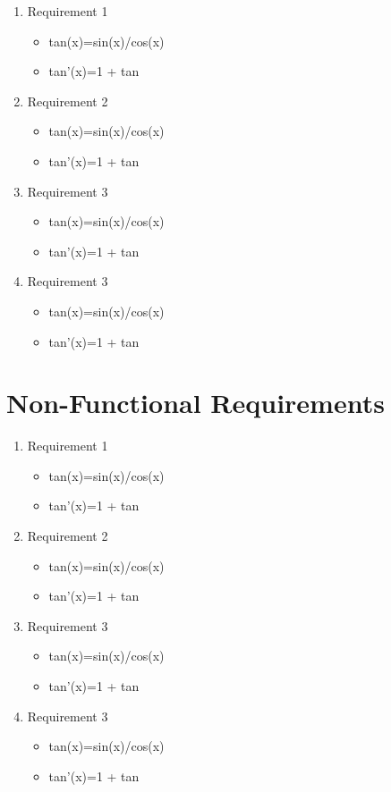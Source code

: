 \documentclass[10pt,a4paper,twoside]{article}
\begin{document}
\begin{enumerate}
\item 
Requirement 1
\begin{itemize}
\item tan(x)=sin(x)/cos(x)
\item tan'(x)=1 + tan
\end{itemize} 
\item
Requirement 2
\begin{itemize}
\item tan(x)=sin(x)/cos(x)
\item tan'(x)=1 + tan
\end{itemize} 
\item
Requirement 3
\begin{itemize}
\item tan(x)=sin(x)/cos(x)
\item tan'(x)=1 + tan
\end{itemize} 
\item
Requirement 3
\begin{itemize}
\item tan(x)=sin(x)/cos(x)
\item tan'(x)=1 + tan
\end{itemize} 

\end{enumerate}
\section{Non-Functional Requirements}

\begin{enumerate}
\item 
Requirement 1
\begin{itemize}
\item tan(x)=sin(x)/cos(x)
\item tan'(x)=1 + tan
\end{itemize} 
\item
Requirement 2
\begin{itemize}
\item tan(x)=sin(x)/cos(x)
\item tan'(x)=1 + tan
\end{itemize} 
\item
Requirement 3
\begin{itemize}
\item tan(x)=sin(x)/cos(x)
\item tan'(x)=1 + tan
\end{itemize} 
\item
Requirement 3
\begin{itemize}
\item tan(x)=sin(x)/cos(x)
\item tan'(x)=1 + tan
\end{itemize} 

\end{enumerate}
\end{document}
